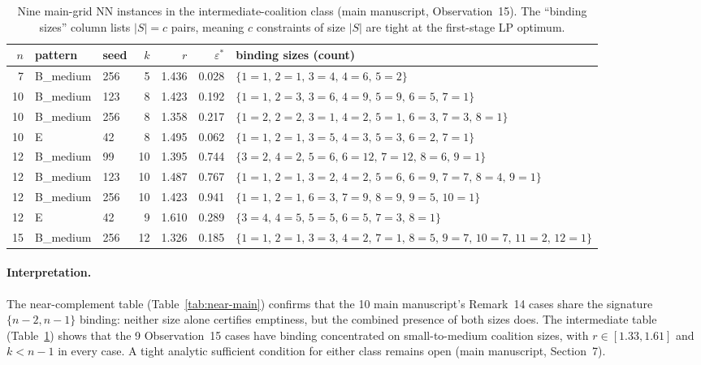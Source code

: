 \documentclass[11pt]{article}
\begin{document}
\begin{table}[htbp]
\centering
\footnotesize
\caption{Nine main-grid NN instances in the intermediate-coalition class (main manuscript, Observation~15). The ``binding sizes'' column lists $|S|=c$ pairs, meaning $c$ constraints of size $|S|$ are tight at the first-stage LP optimum.}
\label{tab:inter-binding}
\begin{tabular}{@{}rllrrrl@{}}
\toprule
$n$ & pattern & seed & $k$ & $r$ & $\varepsilon^{\ast}$ & binding sizes (count) \\
\midrule
 7 & B\_medium & 256 &  5 & 1.436 & 0.028 & $\{1{=}1,\,2{=}1,\,3{=}4,\,4{=}6,\,5{=}2\}$ \\
10 & B\_medium & 123 &  8 & 1.423 & 0.192 & $\{1{=}1,\,2{=}3,\,3{=}6,\,4{=}9,\,5{=}9,\,6{=}5,\,7{=}1\}$ \\
10 & B\_medium & 256 &  8 & 1.358 & 0.217 & $\{1{=}2,\,2{=}2,\,3{=}1,\,4{=}2,\,5{=}1,\,6{=}3,\,7{=}3,\,8{=}1\}$ \\
10 & E        &  42 &  8 & 1.495 & 0.062 & $\{1{=}1,\,2{=}1,\,3{=}5,\,4{=}3,\,5{=}3,\,6{=}2,\,7{=}1\}$ \\
12 & B\_medium &  99 & 10 & 1.395 & 0.744 & $\{3{=}2,\,4{=}2,\,5{=}6,\,6{=}12,\,7{=}12,\,8{=}6,\,9{=}1\}$ \\
12 & B\_medium & 123 & 10 & 1.487 & 0.767 & $\{1{=}1,\,2{=}1,\,3{=}2,\,4{=}2,\,5{=}6,\,6{=}9,\,7{=}7,\,8{=}4,\,9{=}1\}$ \\
12 & B\_medium & 256 & 10 & 1.423 & 0.941 & $\{1{=}1,\,2{=}1,\,6{=}3,\,7{=}9,\,8{=}9,\,9{=}5,\,10{=}1\}$ \\
12 & E        &  42 &  9 & 1.610 & 0.289 & $\{3{=}4,\,4{=}5,\,5{=}5,\,6{=}5,\,7{=}3,\,8{=}1\}$ \\
15 & B\_medium & 256 & 12 & 1.326 & 0.185 & $\{1{=}1,\,2{=}1,\,3{=}3,\,4{=}2,\,7{=}1,\,8{=}5,\,9{=}7,\,10{=}7,\,11{=}2,\,12{=}1\}$ \\
\bottomrule
\end{tabular}
\end{table}

\paragraph{Interpretation.} The near-complement table (Table~\ref{tab:near-main}) confirms that the 10 main manuscript's Remark~14 cases share the signature $\{n-2, n-1\}$ binding: neither size alone certifies emptiness, but the combined presence of both sizes does. The intermediate table (Table~\ref{tab:inter-binding}) shows that the 9 Observation~15 cases have binding concentrated on small-to-medium coalition sizes, with $r\in[1.33,1.61]$ and $k<n-1$ in every case. A tight analytic sufficient condition for either class remains open (main manuscript, Section~7).



\end{document}
